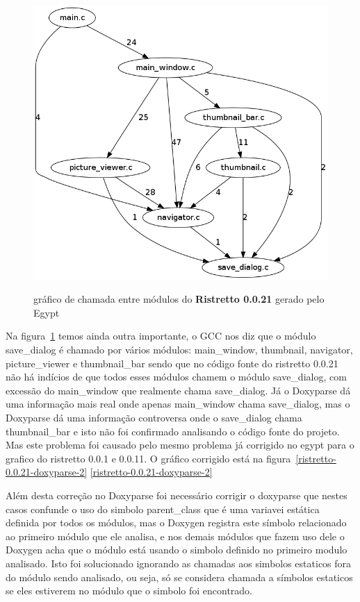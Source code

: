 \begin{figure}
{   \includegraphics[scale=0.5]{imagens/ristretto-0_0_21-gcc}
}
\caption{gráfico de chamada entre módulos do {\bf Ristretto 0.0.21} gerado pelo Egypt}
\label{ristretto-0.0.21}
\end{figure}

Na figura~\ref{ristretto-0.0.21} temos ainda outra importante, o GCC nos diz
que o módulo save\_dialog é chamado por vários módulos: main\_window,
thumbnail, navigator, picture\_viewer e thumbnail\_bar sendo que no código
fonte do ristretto 0.0.21 não há indícios de que todos esses módulos chamem o
módulo save\_dialog, com excessão do main\_window que realmente chama
save\_dialog. Já o Doxyparse dá uma informação mais real onde apenas
main\_window chama save\_dialog, mas o Doxyparse dá uma informação controversa
onde o save\_dialog chama thumbnail\_bar e isto não foi confirmado analisando o
código fonte do projeto. Mas este problema foi causado pelo mesmo problema já
corrigido no egypt para o grafico do ristretto 0.0.1 e 0.0.11. O gráfico
corrigido está na figura~\ref{ristretto-0.0.21-doxyparse-2}
\ref{ristretto-0.0.21-doxyparse-2}

Além desta correção no Doxyparse foi necessário corrigir o doxyparse
que nestes casos confunde o uso do simbolo parent\_class que é uma variavei estática definida
por todos os módulos, mas o Doxygen registra este símbolo relacionado ao
primeiro módulo que ele analisa, e nos demais módulos que fazem uso dele o
Doxygen acha que o módulo está usando o simbolo definido no primeiro modulo
analisado. Isto foi solucionado ignorando as chamadas aos simbolos estaticos
fora do módulo sendo analisado, ou seja, só se considera chamada a símbolos
estaticos se eles estiverem no módulo que o simbolo foi encontrado.

